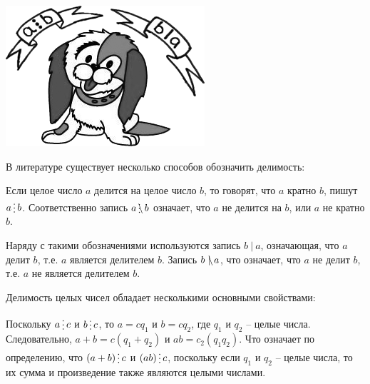 
\begin{floatingfigure}[r]{0.25\textwidth}
	\includegraphics[scale=0.45]{./img/dog}
\end{floatingfigure}
В литературе существует несколько способов обозначить делимость:


Если целое число $a$ делится на целое число $b$, то говорят, что $a$ кратно $b$, пишут $a\del b$. Соответственно запись $a\ndel b$ означает, что $a$ не делится на $b$, или $a$ не кратно $b$. 


Наряду с такими обозначениями используются запись $b~|~a$, означающая, что $a$ делит $b$, т.е. $a$ является делителем $b$. Запись $b~\mathrlap{\backslash}|~a$, что означает, что $a$ не делит $b$, т.е. $a$ не является делителем $b$.


Делимость целых чисел обладает несколькими основными свойствами:





\begin{dok}
    Поскольку $a\del c$ и $b\del c$, то $a = cq_1$ и $b = cq_2$, где $q_1$ и $q_2$ – целые числа. Следовательно,  $a + b = c(q_1 + q_2)$ и $ab = c_2(q_1q_2)$. Что означает по определению, что $(a + b) \del c$ и $(ab) \del c$, поскольку если    $q_1$ и $q_2$ – целые числа, то их сумма и произведение также являются целыми числами. 
\end{dok}

